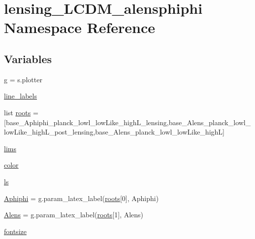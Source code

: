 \hypertarget{namespacelensing__LCDM__alensphiphi}{}\section{lensing\+\_\+\+L\+C\+D\+M\+\_\+alensphiphi Namespace Reference}
\label{namespacelensing__LCDM__alensphiphi}
\subsection*{Variables}
\begin{DoxyCompactItemize}
\item 
\mbox{\hyperlink{namespacelensing__LCDM__alensphiphi_a9edc2d83ad76c5ecd54f2428593086cc}{g}} = s.\+plotter
\item 
\mbox{\hyperlink{namespacelensing__LCDM__alensphiphi_a8ffb5004674f4879a571a060719683e3}{line\+\_\+labels}}
\item 
list \mbox{\hyperlink{namespacelensing__LCDM__alensphiphi_ad68350b3b690478d68088d32a6049b33}{roots}} = \mbox{[}\textquotesingle{}base\+\_\+\+Aphiphi\+\_\+planck\+\_\+lowl\+\_\+low\+Like\+\_\+high\+L\+\_\+lensing\textquotesingle{},\textquotesingle{}base\+\_\+\+Alens\+\_\+planck\+\_\+lowl\+\_\+low\+Like\+\_\+high\+L\+\_\+post\+\_\+lensing\textquotesingle{},\textquotesingle{}base\+\_\+\+Alens\+\_\+planck\+\_\+lowl\+\_\+low\+Like\+\_\+highL\textquotesingle{}\mbox{]}
\item 
\mbox{\hyperlink{namespacelensing__LCDM__alensphiphi_a0ea49ed46dc678ad6cf7630813e8d10c}{lims}}
\item 
\mbox{\hyperlink{namespacelensing__LCDM__alensphiphi_a9c2d2d78294ddcd3573e2a096acbc90d}{color}}
\item 
\mbox{\hyperlink{namespacelensing__LCDM__alensphiphi_a5525473897bac9675c6359a5d5538bcf}{ls}}
\item 
\mbox{\hyperlink{namespacelensing__LCDM__alensphiphi_a8c9dc9c46847b6b3f402d03ba4abaff3}{Aphiphi}} = g.\+param\+\_\+latex\+\_\+label(\mbox{\hyperlink{namespacelensing__LCDM__alensphiphi_ad68350b3b690478d68088d32a6049b33}{roots}}\mbox{[}0\mbox{]}, \textquotesingle{}Aphiphi\textquotesingle{})
\item 
\mbox{\hyperlink{namespacelensing__LCDM__alensphiphi_a571f667d1a27393cbb50615bf24a4c83}{Alens}} = g.\+param\+\_\+latex\+\_\+label(\mbox{\hyperlink{namespacelensing__LCDM__alensphiphi_ad68350b3b690478d68088d32a6049b33}{roots}}\mbox{[}1\mbox{]}, \textquotesingle{}Alens\textquotesingle{})
\item 
\mbox{\hyperlink{namespacelensing__LCDM__alensphiphi_a34744d3c5dc3646e2274ad1bd67385fd}{fontsize}}
\end{DoxyCompactItemize}


